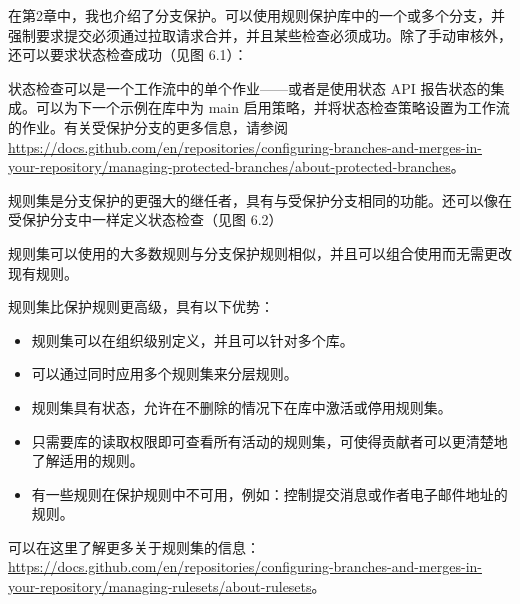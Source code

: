 
在第2章中，我也介绍了分支保护。可以使用规则保护库中的一个或多个分支，并强制要求提交必须通过拉取请求合并，并且某些检查必须成功。除了手动审核外，还可以要求状态检查成功（见图 6.1）：


状态检查可以是一个工作流中的单个作业——或者是使用状态 API 报告状态的集成。可以为下一个示例在库中为 main 启用策略，并将状态检查策略设置为工作流的作业。有关受保护分支的更多信息，请参阅 \url{https://docs.github.com/en/repositories/configuring-branches-and-merges-in-your-repository/managing-protected-branches/about-protected-branches}。


规则集是分支保护的更强大的继任者，具有与受保护分支相同的功能。还可以像在受保护分支中一样定义状态检查（见图 6.2）


规则集可以使用的大多数规则与分支保护规则相似，并且可以组合使用而无需更改现有规则。

规则集比保护规则更高级，具有以下优势：

\begin{itemize}
\item 
规则集可以在组织级别定义，并且可以针对多个库。

\item
可以通过同时应用多个规则集来分层规则。

\item
规则集具有状态，允许在不删除的情况下在库中激活或停用规则集。

\item
只需要库的读取权限即可查看所有活动的规则集，可使得贡献者可以更清楚地了解适用的规则。

\item
有一些规则在保护规则中不可用，例如：控制提交消息或作者电子邮件地址的规则。
\end{itemize}

可以在这里了解更多关于规则集的信息：\url{https://docs.github.com/en/repositories/configuring-branches-and-merges-in-your-repository/managing-rulesets/about-rulesets}。